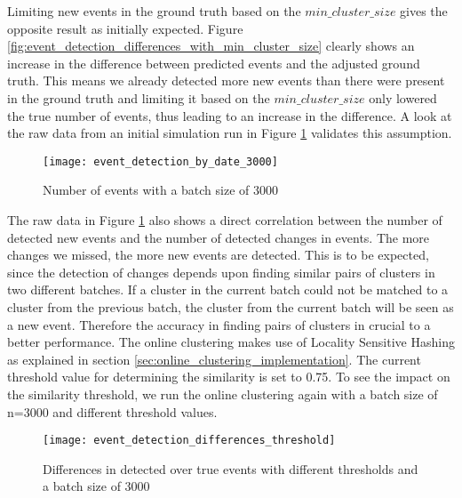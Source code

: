 Limiting new events in the ground truth based on the $min\_cluster\_size$ gives the opposite result as initially expected. 
Figure \ref{fig:event_detection_differences_with_min_cluster_size} clearly shows an increase in the difference between predicted events and the adjusted ground truth. This means we already detected more new events than there were present in the ground truth and limiting it based on the $min\_cluster\_size$ only lowered the true number of events, thus leading to an increase in the difference. A look at the raw data from an initial simulation run in Figure \ref{fig:event_detection_by_date_3000} validates this assumption.

\begin{figure}[h]
    \centering
    \texttt{[image: event\_detection\_by\_date\_3000]}
    \caption{Number of events with a batch size of 3000}
    \label{fig:event_detection_by_date_3000}
\end{figure}

The raw data in Figure \ref{fig:event_detection_by_date_3000} also shows a direct correlation between the number of detected new events and the number of detected changes in events. The more changes we missed, the more new events are detected. This is to be expected, since the detection of changes depends upon finding similar pairs of clusters in two different batches. If a cluster in the current batch could not be matched to a cluster from the previous batch, the cluster from the current batch will be seen as a new event. Therefore the accuracy in finding pairs of clusters in crucial to a better performance. The online clustering makes use of Locality Sensitive Hashing as explained in section \ref{sec:online_clustering_implementation}. The current threshold value for determining the similarity is set to 0.75. To see the impact on the similarity threshold, we run the online clustering again with a batch size of n=3000 and different threshold values.

\begin{figure}[h]
    \centering
    \texttt{[image: event\_detection\_differences\_threshold]}
    \caption{Differences in detected over true events with different thresholds and a batch size of 3000}
    \label{fig:event_detection_differences_threshold}
\end{figure}

